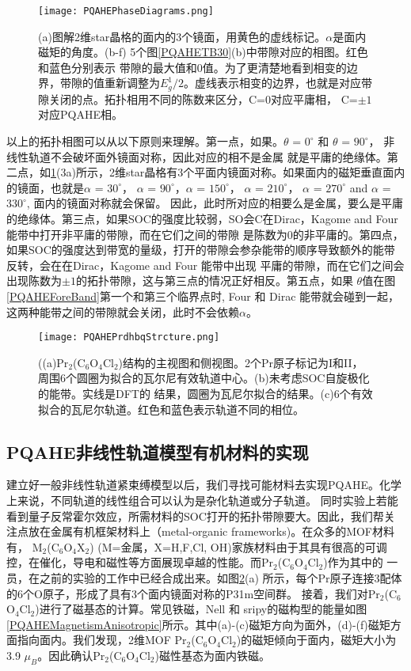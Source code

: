 \begin{figure}[htb]
  \centering
  \texttt{[image: PQAHEPhaseDiagrams.png]}
  \caption{(a)图解2维star晶格的面内的3个镜面，用黄色的虚线标记。$\alpha$是面内磁矩的角度。(b-f) 5个图\ref{PQAHETB30}(b)中带隙对应的相图。红色和蓝色分别表示
  带隙的最大值和0值。为了更清楚地看到相变的边界，带隙的值重新调整为$E_g^1/2$。虚线表示相变的边界，也就是对应带隙关闭的点。拓扑相用不同的陈数来区分，C=0对应平庸相，
  C=$\pm 1$对应PQAHE相。}
  \label{PQAHEPhaseDiagrams}
  \note{}
\end{figure}

以上的拓扑相图可以从以下原则来理解。第一点，如果。$\theta$ = $0^\circ$ 和 $\theta$ = $90^\circ$， 非线性轨道不会破坏面外镜面对称，因此对应的相不是金属
就是平庸的绝缘体。第二点，如\ref{PQAHEPhaseDiagrams}(3a)所示，2维star晶格有3个平面内镜面对称。如果面内的磁矩垂直面内的镜面，也就是$\alpha$ = $30^\circ$，
$\alpha$ = $90^\circ$，$\alpha$ = $150^\circ$， $\alpha$ = $210^\circ$， $\alpha$ = $270^\circ$ and $\alpha$ = $330^\circ$, 面内的镜面对称就会保留。
因此，此时所对应的相要么是金属，要么是平庸的绝缘体。第三点，如果SOC的强度比较弱，SO会C在Dirac，Kagome and Four 能带中打开非平庸的带隙，而在它们之间的带隙
是陈数为0的非平庸的\cite{PQAHE19}。第四点，如果SOC的强度达到带宽的量级，打开的带隙会参杂能带的顺序导致额外的能带反转\cite{PQAHE42}，会在在Dirac，Kagome and Four 能带中出现
平庸的带隙，而在它们之间会出现陈数为$\pm 1$的拓扑带隙，这与第三点的情况正好相反。第五点，如果 $\theta$值在图\ref{PQAHEForeBand}第一个和第三个临界点时,
Four 和 Dirac 能带就会碰到一起，这两种能带之间的带隙就会关闭，此时不会依赖$\alpha$。

\begin{figure}[htb]
  \centering
  \texttt{[image: PQAHEPrdhbqStrcture.png]}
  \caption{((a)Pr$_2$(C$_6$O$_4$Cl$_2$)结构的主视图和侧视图。2个Pr原子标记为I和II，周围6个圆圈为拟合的瓦尔尼有效轨道中心。(b)未考虑SOC自旋极化的能带。实线是DFT的
  结果，圆圈为瓦尼尔拟合的结果。(c)6个有效拟合的瓦尼尔轨道。红色和蓝色表示轨道不同的相位。}
  \label{PQAHEPrdhbqStrcture}
  \note{}
\end{figure}


\subsection{PQAHE非线性轨道模型有机材料的实现}
建立好一般非线性轨道紧束缚模型以后，我们寻找可能材料去实现PQAHE。化学上来说，不同轨道的线性组合可以认为是杂化轨道或分子轨道。
同时实验上若能看到量子反常霍尔效应，所需材料的SOC打开的拓扑带隙要大。因此，我们帮关注点放在金属有机框架材料上（metal-organic frameworks)。在众多的MOF材料有，
M$_2$(C$_6$O$_4$X$_2$) (M=金属，X=H,F,Cl, OH)家族材料由于其具有很高的可调控，在催化，导电和磁性等方面展现卓越的性能。而Pr$_2$(C$_6$O$_4$Cl$_2$)作为其中的
一员，在之前的实验的工作中已经合成出来\cite{PQAHE44}。如图\ref{PQAHEPrdhbqStrcture}(a) 所示，每个Pr原子连接3配体的6个O原子，形成了具有3个面内镜面对称的P31m空间群。
接着，我们对Pr$_2$(C$_6$O$_4$Cl$_2$)进行了磁基态的计算。常见铁磁，Nell 和 sripy的磁构型的能量如图\ref{PQAHEMagnetismAnisotropic}所示。其中(a)-(c)磁矩方向为面外，(d)-(f)磁矩方
面指向面内。我们发现，2维MOF Pr$_2$(C$_6$O$_4$Cl$_2$)的磁矩倾向于面内，磁矩大小为3.9 $\mu_B$。因此确认Pr$_2$(C$_6$O$_4$Cl$_2$)磁性基态为面内铁磁。

